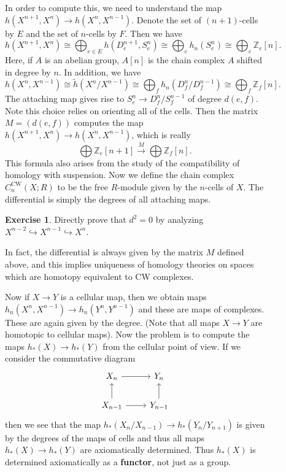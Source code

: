 \documentclass[leqno, openany]{memoir}
\theoremstyle{definition}
\newtheorem{exer}[thm]{Exercise}
\theoremstyle{remark}
\theoremstyle{plain}
\theoremstyle{definition}
\theoremstyle{remark}
\newcommand{\Z}{\mathbb{Z}}
\newcommand{\mr}[1]{\mathrm{#1}}
\newcommand{\wt}[1]{\widetilde{#1}}
\begin{document}
\begin{figure}[H]
In order to compute this, we need to understand the map $h(X^{n+1}, X^n) \to
h(X^n, X^{n-1})$. Denote the set of $(n+1)$-cells by $E$ and the set of
$n$-cells by $F$. Then we have \[ h(X^{n+1}, X^n) \cong \bigoplus_{e \in E}
h(D_e^{n+1}, S_e^n) \cong \bigoplus_e h_n(S^n_e) \cong \bigoplus_e \Z_e [n]. \]
Here, if $A$ is an abelian group, $A[n]$ is the chain complex $A$ shifted in
degree by $n$. In addition, we have \[ h(X^n, X^{n-1}) \cong \wt{h}(X^n /
X^{n-1}) \cong \bigoplus_f h_n(D_f^n / D_f^{n-1}) \cong \bigoplus_f \Z_f [n].
\] The attaching map gives rise to $S_e^n \to D_f^n / S_f^{n-1}$ of degree
$d(e,f)$. Note this choice relies on orienting all of the cells. Then the
matrix $M = (d(e,f))$ computes the map $h(X^{n+1}, X^n) \to h(X^n, X^{n-1})$,
which is really \[ \bigoplus \Z_e [n+1] \xrightarrow{M} \bigoplus \Z_f [n]. \]
This formula also arises from the study of the compatibility of homology with
suspension. Now we define the chain complex $C_n^{\mr{CW}}(X; R)$ to be the
free $R$-module given by the $n$-cells of $X$. The differential is simply the
degrees of all attaching maps.

\begin{exer} Directly prove that $d^2 = 0$ by analyzing $X^{n-2}
\hookrightarrow X^{n-1} \hookrightarrow X^n$.  \end{exer}

In fact, the differential is always given by the matrix $M$ defined above, and
this implies uniqueness of homology theories on spaces which are homotopy
equivalent to CW complexes.

Now if $X \to Y$ is a cellular map, then we obtain maps $h_n(X^n, X^{n-1}) \to
h_n(Y^n, Y^{n-1})$ and these are maps of complexes. These are again given by
the degree. (Note that all maps $X \to Y$ are homotopic to cellular maps). Now
the problem is to compute the maps $h_*(X) \to h_*(Y)$ from the cellular point
of view. If we consider the commutative diagram \begin{equation*}
    \begin{tikzcd} X_n \arrow{r} & Y_n \\ X_{n-1} \arrow{r} \arrow{u} & Y_{n-1}
    \arrow{u} \end{tikzcd} \end{equation*} then we see that the map $h_*(X_n /
    X_{n-1}) \to h_*(Y_n / Y_{n+1})$ is given by the degrees of the maps of
    cells and thus all maps $h_*(X) \to h_*(Y)$ are axiomatically determined.
    Thus $h_*(X)$ is determined axiomatically as a \textbf{functor}, not just
    as a group.


\end{figure}
\end{document}
